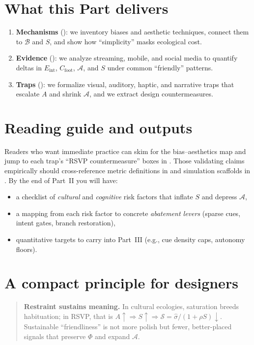 \documentclass[openany]{book}
\newcommand{\Eint}{E_{\mathrm{int}}} %
\newcommand{\Cfoot}{C_{\mathrm{foot}}} %
\newcommand{\Auton}{\mathcal{A}} %
\begin{document}
\section*{What this Part delivers}
\begin{enumerate}[label=\textbf{P2.\arabic*}, leftmargin=*, itemsep=2pt]
  \item \textbf{Mechanisms} (): we inventory biases and aesthetic techniques, connect them to $\mathcal{B}$ and $S$, and show how “simplicity” masks ecological cost.
  \item \textbf{Evidence} (): we analyze streaming, mobile, and social media to quantify deltas in $\Eint$, $\Cfoot$, $\Auton$, and $S$ under common “friendly” patterns.
  \item \textbf{Traps} (): we formalize visual, auditory, haptic, and narrative traps that escalate $A$ and shrink $\Auton$, and we extract design countermeasures.
\end{enumerate}

\section*{Reading guide and outputs}
Readers who want immediate practice can skim  for the bias–aesthetics map and jump to each trap’s “RSVP countermeasure” boxes in . Those validating claims empirically should cross-reference metric definitions in  and simulation scaffolds in . By the end of Part~II you will have:
\begin{itemize}
  \item a checklist of \emph{cultural} and \emph{cognitive} risk factors that inflate $S$ and depress $\Auton$,
  \item a mapping from each risk factor to concrete \emph{abatement levers} (sparse cues, intent gates, branch restoration),
  \item quantitative targets to carry into Part~III (e.g., cue density caps, autonomy floors).
\end{itemize}

\section*{A compact principle for designers}
\begin{quote}
\textbf{Restraint sustains meaning.} In cultural ecologies, saturation breeds habituation; in RSVP, that is $A\uparrow \Rightarrow S\uparrow \Rightarrow \mathcal{S}=\widehat{\sigma}/(1+\rho S)\downarrow$. Sustainable “friendliness” is not more polish but fewer, better-placed signals that preserve $\Phi$ and expand $\Auton$.
\end{quote}
\end{document}
